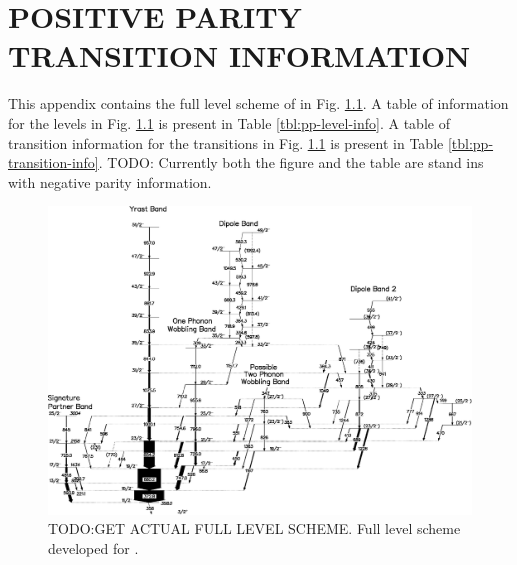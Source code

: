 %
%

\chapter{POSITIVE PARITY TRANSITION INFORMATION}
\label{app:pos-par-info}
This appendix contains the full level scheme of \pr{} in Fig. \ref{fig:pp-full-lvl-scheme}. A table of information for the levels in Fig. \ref{fig:pp-full-lvl-scheme} is present in Table \ref{tbl:pp-level-info}. A table of transition information for the transitions in Fig. \ref{fig:pp-full-lvl-scheme} is present in Table \ref{tbl:pp-transition-info}. TODO: Currently both the figure and the table are stand ins with negative parity information.

\begin{landscape}
\begin{figure}[h!]
\centerline{\includegraphics[height=\textheight]{./img/app_pp/135Pr_Np_for_diss.eps}}
	\caption{TODO:GET ACTUAL FULL LEVEL SCHEME. Full level scheme developed for \pr{}.\label{fig:pp-full-lvl-scheme}}
\end{figure}
\end{landscape}

